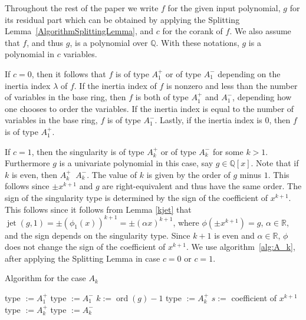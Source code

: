 \documentclass[noend]{amsproc}
\DeclareMathOperator{\ord}{ord}
\DeclareMathOperator{\requiv}{\overset{r}{\sim}}
\DeclareMathOperator{\jt}{jet}
\begin{document}
Throughout the rest of the paper we write $f$ for the given input polynomial,
$g$ for its residual part which can be obtained by applying the Splitting
Lemma~\ref{AlgorithmSplittingLemma}, and $c$ for the corank of $f$.
We also assume that $f$, and thus $g$, is a polynomial over $\mathbb Q$.
With these notations, $g$ is a polynomial in $c$ variables.

If $c = 0$, then it follows  that $f$ is of type
$A_1^+$ or of type $A_1^-$ depending on the inertia index $\lambda$ of $f$. If
the inertia index of $f$ is nonzero and less than the number of variables in
the base ring, then $f$ is both of type $A_1^+$ and $A_1^-$, depending how one
chooses to order the variables. If the inertia index is equal to the number of
variables in the base ring, $f$ is of type $A_1^-$. Lastly, if the inertia
index is $0$, then $f$ is of type $A_1^+$.

If $c=1$, then the singularity is of type
$A_k^+$ or of type $A_k^-$ for some $k>1$. Furthermore $g$ is a univariate
polynomial in this case, say $g\in\mathbb Q[x]$. Note that if $k$ is even, then
$A_k^+\requiv A_k^-$. The value of $k$ is given by the order of $g$ minus $1$.
This follows since $\pm x^{k+1}$ and $g$ are right-equivalent and thus have the
same order. The sign of the singularity type is determined by the sign of the
coefficient of $x^{k+1}$. This follows since it follows from Lemma \ref{kjet}
that $\jt(g,1)=\pm(\phi_1(x))^{k+1}=\pm(\alpha x)^{k+1}$, where $\phi(\pm
x^{k+1})=g$, $\alpha\in\mathbb R$, and the sign depends on the singularity
type.  Since $k+1$ is even and $\alpha\in\mathbb R$, $\phi$ does not change the
sign of the coefficient of $x^{k+1}$. We use algorithm~\ref{alg:A_k}, after
applying the Splitting Lemma in case $c=0$ or $c=1$.

\begin{algorithm}[h]
\caption{\label{alg:A_k} Algorithm for the case $A_k$}
\begin{algorithmic}[1]



\STATE type $:=A_1^+$
\ELSE
\STATE type $:=A_1^-$
\ENDIF
\ENDIF
{}
\STATE $k:= \ord(g)-1$
\STATE type $:=A_k^+$
\ELSE
\STATE $s:=$ coefficient of $x^{k+1}$
\STATE type $:=A_k^+$
\ELSE
\STATE type $:=A_k^-$
\ENDIF
\ENDIF
\ENDIF
{}

\end{algorithmic}
\end{algorithm}
\end{document}
